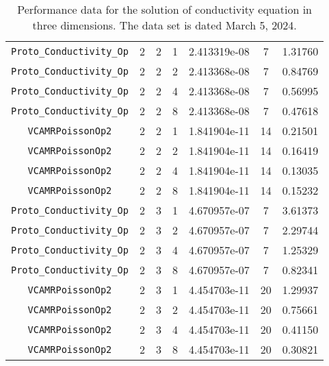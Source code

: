 \documentclass{article}
\begin{document}
\begin{small}
\begin{table}
\begin{center}
\begin{tabular}{|c|c|c|c|c|c||c|}
\hline
 {\tt Proto\_Conductivity\_Op}      & 2 & 2 & 1   & 2.413319e-08   &    7    & 1.31760    \\
 {\tt Proto\_Conductivity\_Op}      & 2 & 2 & 2   & 2.413368e-08   &    7    & 0.84769    \\
 {\tt Proto\_Conductivity\_Op}      & 2 & 2 & 4   & 2.413368e-08   &    7    & 0.56995    \\
 {\tt Proto\_Conductivity\_Op}      & 2 & 2 & 8   & 2.413368e-08   &    7    & 0.47618    \\
\hline                                                                          
 {\tt VCAMRPoissonOp2}              & 2 & 2 & 1   & 1.841904e-11   &  14     & 0.21501    \\
 {\tt VCAMRPoissonOp2}              & 2 & 2 & 2   & 1.841904e-11   &  14     & 0.16419    \\
 {\tt VCAMRPoissonOp2}              & 2 & 2 & 4   & 1.841904e-11   &  14     & 0.13035    \\
 {\tt VCAMRPoissonOp2}              & 2 & 2 & 8   & 1.841904e-11   &  14     & 0.15232    \\
\hline
 {\tt Proto\_Conductivity\_Op}      & 2 & 3 & 1   & 4.670957e-07   &   7     & 3.61373    \\
 {\tt Proto\_Conductivity\_Op}      & 2 & 3 & 2   & 4.670957e-07   &   7     & 2.29744    \\
 {\tt Proto\_Conductivity\_Op}      & 2 & 3 & 4   & 4.670957e-07   &   7     & 1.25329    \\
 {\tt Proto\_Conductivity\_Op}      & 2 & 3 & 8   & 4.670957e-07   &   7     & 0.82341    \\
\hline                                                                           
 {\tt VCAMRPoissonOp2}              & 2 & 3 & 1   & 4.454703e-11   &   20    &  1.29937   \\
 {\tt VCAMRPoissonOp2}              & 2 & 3 & 2   & 4.454703e-11   &   20    &  0.75661   \\
 {\tt VCAMRPoissonOp2}              & 2 & 3 & 4   & 4.454703e-11   &   20    &  0.41150   \\
 {\tt VCAMRPoissonOp2}              & 2 & 3 & 8   & 4.454703e-11   &   20    &  0.30821   \\
 \hline
\end{tabular}
\end{center}
\label{tab::6}
\caption
    {
      Performance data for the solution of conductivity
      equation in three dimensions.
      The data set is dated March 5, 2024.
    }
\end{table}
\end{small}
\end{document}
